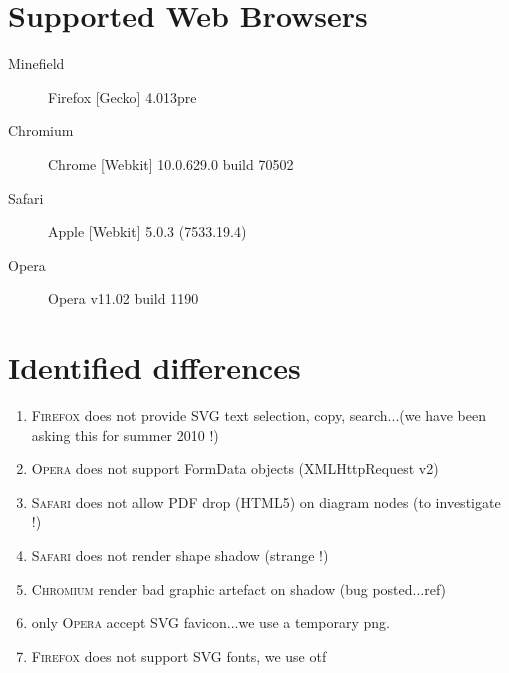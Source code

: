 \documentclass{article}
\newcommand{\ff}{\textsc{Firefox}\xspace}
\newcommand{\ch}{\textsc{Chromium}\xspace}
\newcommand{\sa}{\textsc{Safari}\xspace}
\newcommand{\op}{\textsc{Opera}\xspace}
\begin{document}
\section{Supported Web Browsers}
\date{\today}
\begin{description}
\item[Minefield] Firefox [Gecko] 4.013pre
\item[Chromium] Chrome [Webkit] 10.0.629.0 build 70502
\item[Safari] Apple [Webkit] 5.0.3 (7533.19.4)
\item[Opera] Opera v11.02 build 1190
\end{description}

\section{Identified differences}
\begin{enumerate}
\item \ff does not provide SVG text selection, copy, search...(we have been asking this for summer 2010 !)
\item \op does not support FormData objects (XMLHttpRequest v2)
\item \sa does not allow PDF drop (HTML5) on diagram nodes (to investigate !)
\item \sa does not render shape shadow (strange !)
\item \ch render bad graphic artefact on shadow (bug posted...ref)
\item only \op accept SVG favicon...we use a temporary png. 
\item \ff does not support SVG fonts, we use otf
\end{enumerate}
\end{document}
